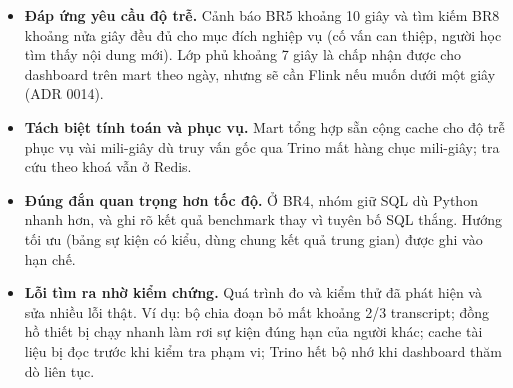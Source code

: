\begin{itemize}
  \item \textbf{Đáp ứng yêu cầu độ trễ.} Cảnh báo BR5 khoảng 10 giây và tìm kiếm BR8 khoảng nửa giây đều đủ cho mục đích nghiệp vụ (cố vấn can thiệp, người học tìm thấy nội dung mới). Lớp phủ khoảng 7 giây là chấp nhận được cho dashboard trên mart theo ngày, nhưng sẽ cần Flink nếu muốn dưới một giây (ADR 0014).
  \item \textbf{Tách biệt tính toán và phục vụ.} Mart tổng hợp sẵn cộng cache cho độ trễ phục vụ vài mili-giây dù truy vấn gốc qua Trino mất hàng chục mili-giây; tra cứu theo khoá vẫn ở Redis.
  \item \textbf{Đúng đắn quan trọng hơn tốc độ.} Ở BR4, nhóm giữ SQL dù Python nhanh hơn, và ghi rõ kết quả benchmark thay vì tuyên bố SQL thắng. Hướng tối ưu (bảng sự kiện có kiểu, dùng chung kết quả trung gian) được ghi vào hạn chế.
  \item \textbf{Lỗi tìm ra nhờ kiểm chứng.} Quá trình đo và kiểm thử đã phát hiện và sửa nhiều lỗi thật. Ví dụ: bộ chia đoạn bỏ mất khoảng 2/3 transcript; đồng hồ thiết bị chạy nhanh làm rơi sự kiện đúng hạn của người khác; cache tài liệu bị đọc trước khi kiểm tra phạm vi; Trino hết bộ nhớ khi dashboard thăm dò liên tục.
\end{itemize}
